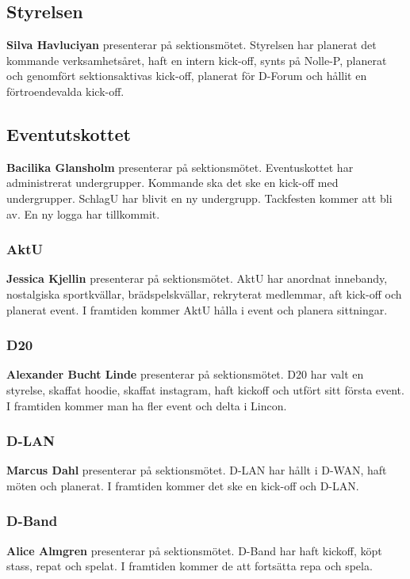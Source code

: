 \documentclass[../protokoll_hostmote_2021.tex]{subfiles}
\begin{document}
\subsection{Styrelsen}
\textbf{Silva Havluciyan} presenterar på sektionsmötet. Styrelsen har planerat det kommande verksamhetsåret, haft en intern kick-off, synts på Nolle-P, planerat och genomfört sektionsaktivas kick-off, planerat för D-Forum och hållit en förtroendevalda kick-off.
 
\subsection{Eventutskottet}
\textbf{Bacilika Glansholm} presenterar på sektionsmötet. Eventuskottet har administrerat undergrupper. Kommande ska det ske en kick-off med undergrupper. SchlagU har blivit en ny undergrupp. Tackfesten kommer att bli av. En ny logga har tillkommit.

\subsubsection{AktU}
\textbf{Jessica Kjellin} presenterar på sektionsmötet. AktU har anordnat innebandy, nostalgiska sportkvällar, brädspelskvällar, rekryterat medlemmar, aft kick-off och planerat event. I framtiden kommer AktU hålla i event och planera sittningar.



\subsubsection{D20}
\textbf{Alexander Bucht Linde} presenterar på sektionsmötet. D20 har valt en styrelse, skaffat hoodie, skaffat instagram, haft kickoff och utfört sitt första event. I framtiden kommer man ha fler event och delta i Lincon.



\subsubsection{D-LAN}
\textbf{Marcus Dahl} presenterar på sektionsmötet. D-LAN har hållt i D-WAN, haft möten och planerat. I framtiden kommer det ske en kick-off och D-LAN.



\subsubsection{D-Band}
\textbf{Alice Almgren} presenterar på sektionsmötet. D-Band har haft kickoff, köpt stass, repat och spelat. I framtiden kommer de att fortsätta repa och spela.
\end{document}
